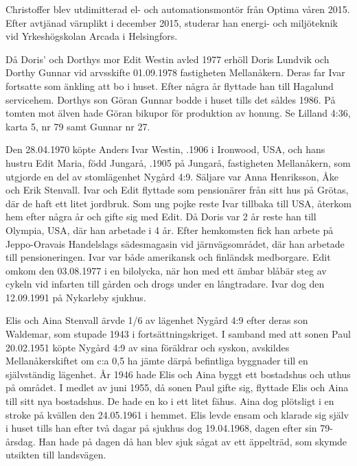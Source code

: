 Christoffer blev utdimitterad el- och automationsmontör från Optima våren 2015. Efter avtjänad värnplikt i december 2015, studerar han energi- och miljöteknik vid Yrkeshögskolan Arcada i Helsingfors.


Då Doris' och Dorthys mor Edit Westin avled 1977 erhöll Doris Lundvik och Dorthy Gunnar vid arvsskifte 01.09.1978 fastigheten Mellanåkern. Deras far Ivar fortsatte som änkling att bo i huset. Efter några år flyttade han till Hagalund servicehem. Dorthys son Göran Gunnar bodde i huset tills det såldes 1986. På tomten mot älven hade Göran bikupor för produktion av honung. Se Lilland 4:36, karta 5, nr 79 samt Gunnar nr 27.


Den 28.04.1970 köpte Anders Ivar Westin, .1906 i Ironwood, USA, och hans hustru Edit Maria, född Jungarå, .1905 	på Jungarå,	fastigheten Mellanåkern, som utgjorde en del av stomlägenhet Nygård 4:9. Säljare var Anna Henriksson, Åke och Erik Stenvall. Ivar och Edit flyttade som pensionärer från sitt hus på Grötas, där de haft ett litet jordbruk. Som ung pojke reste Ivar tillbaka till USA, återkom hem efter några år och gifte sig med Edit. Då Doris var 2 år reste han till Olympia, USA, där han arbetade i 4 år. Efter hemkomsten fick han arbete på Jeppo-Oravais Handelslags sädesmagasin vid järnvägsområdet, där han arbetade till pensioneringen. Ivar var både amerikansk och finländsk medborgare. Edit omkom den 03.08.1977 i en bilolycka, när hon med ett ämbar blåbär steg av cykeln vid infarten till gården och drogs under en långtradare. Ivar dog den 12.09.1991 på Nykarleby sjukhus.


Elis och Aina Stenvall ärvde 1/6 av lägenhet Nygård 4:9 efter deras son Waldemar, som stupade 1943 i fortsättningskriget. I samband med att sonen Paul 20.02.1951 köpte Nygård 4:9 av sina föräldrar och syskon, avskildes Mellanåkerskiftet om c:a 0,5 ha jämte därpå befintliga byggnader till en självständig lägenhet. År 1946 hade Elis och Aina byggt ett bostadshus och uthus på området. I medlet av juni 1955, då sonen Paul gifte sig, flyttade Elis och Aina till sitt nya bostadshus. De hade en ko i ett litet fähus. Aina dog plötsligt i en stroke på kvällen den 24.05.1961 i hemmet. Elis levde ensam och klarade sig själv i huset tills han efter två dagar på sjukhus dog 19.04.1968, dagen efter sin 79-årsdag. Han hade på dagen då han blev sjuk sågat av ett äppelträd, som skymde utsikten till landsvägen.


